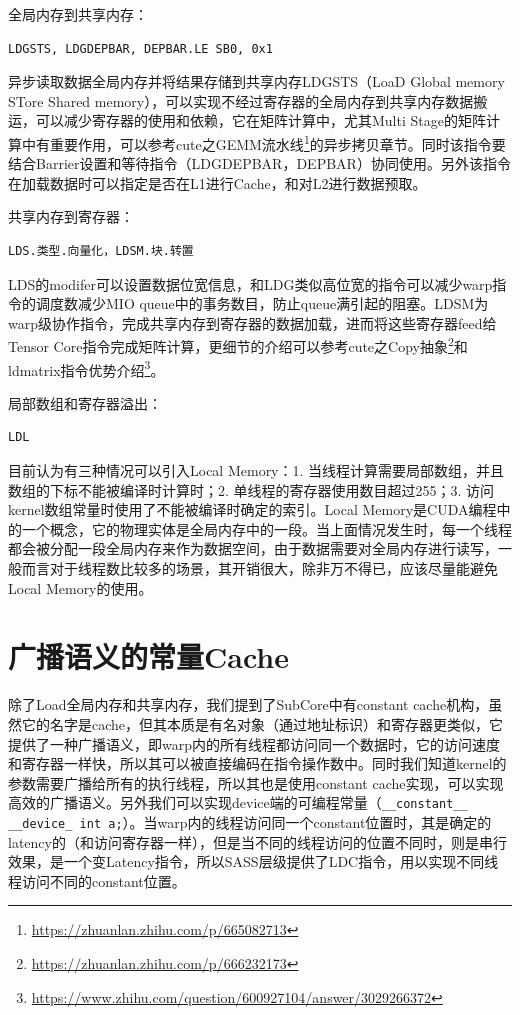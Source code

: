 全局内存到共享内存：

\begin{lstlisting}
LDGSTS, LDGDEPBAR, DEPBAR.LE SB0, 0x1
\end{lstlisting}

异步读取数据全局内存并将结果存储到共享内存LDGSTS（LoaD Global memory STore Shared memory），可以实现不经过寄存器的全局内存到共享内存数据搬运，可以减少寄存器的使用和依赖，它在矩阵计算中，尤其Multi Stage的矩阵计算中有重要作用，可以参考cute之GEMM流水线\footnote{\url{https://zhuanlan.zhihu.com/p/665082713}}的异步拷贝章节。同时该指令要结合Barrier设置和等待指令（LDGDEPBAR，DEPBAR）协同使用。另外该指令在加载数据时可以指定是否在L1进行Cache，和对L2进行数据预取。

共享内存到寄存器：

\begin{lstlisting}
LDS.类型.向量化，LDSM.块.转置
\end{lstlisting}

LDS的modifer可以设置数据位宽信息，和LDG类似高位宽的指令可以减少warp指令的调度数减少MIO queue中的事务数目，防止queue满引起的阻塞。LDSM为warp级协作指令，完成共享内存到寄存器的数据加载，进而将这些寄存器feed给Tensor Core指令完成矩阵计算，更细节的介绍可以参考cute之Copy抽象\footnote{\url{https://zhuanlan.zhihu.com/p/666232173}}和ldmatrix指令优势介绍\footnote{\url{https://www.zhihu.com/question/600927104/answer/3029266372}}。

局部数组和寄存器溢出：

\begin{lstlisting}
LDL
\end{lstlisting}

目前认为有三种情况可以引入Local Memory：1. 当线程计算需要局部数组，并且数组的下标不能被编译时计算时；2. 单线程的寄存器使用数目超过255；3. 访问kernel数组常量时使用了不能被编译时确定的索引。Local Memory是CUDA编程中的一个概念，它的物理实体是全局内存中的一段。当上面情况发生时，每一个线程都会被分配一段全局内存来作为数据空间，由于数据需要对全局内存进行读写，一般而言对于线程数比较多的场景，其开销很大，除非万不得已，应该尽量能避免Local  Memory的使用。

\section{广播语义的常量Cache}

除了Load全局内存和共享内存，我们提到了SubCore中有constant cache机构，虽然它的名字是cache，但其本质是有名对象（通过地址标识）和寄存器更类似，它提供了一种广播语义，即warp内的所有线程都访问同一个数据时，它的访问速度和寄存器一样快，所以其可以被直接编码在指令操作数中。同时我们知道kernel的参数需要广播给所有的执行线程，所以其也是使用constant cache实现，可以实现高效的广播语义。另外我们可以实现device端的可编程常量（\lstinline|__constant__ __device_ int a;|）。当warp内的线程访问同一个constant位置时，其是确定的latency的（和访问寄存器一样），但是当不同的线程访问的位置不同时，则是串行效果，是一个变Latency指令，所以SASS层级提供了LDC指令，用以实现不同线程访问不同的constant位置。

